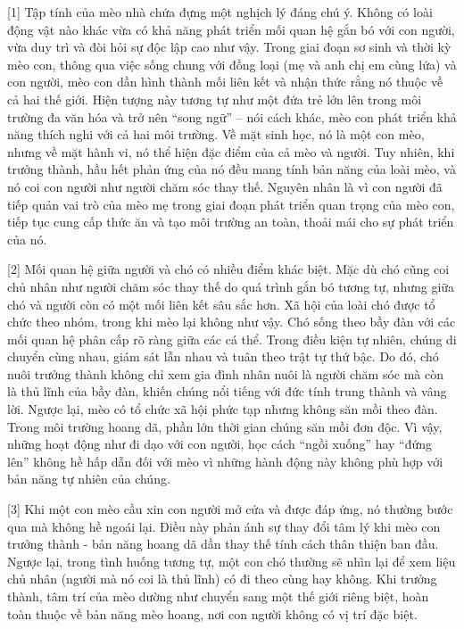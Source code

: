 \documentclass[12pt,a4paper,twoside]{article}
\newenvironment{readingpassage}[1][]{%
    \begin{tcolorbox}[enhanced, colback=grayLight, colframe=secondaryBlue,
        coltitle=textDark, fonttitle=\bfseries, title={#1},
        rounded corners, arc=3mm, boxrule=1pt,
        left=15pt, right=15pt, top=10pt, bottom=10pt,
        breakable, before skip=10pt, after skip=10pt, drop fuzzy shadow]
    \setstretch{1.3}
}{\end{tcolorbox}}
\begin{document}
\begin{readingpassage}[]
[1] Tập tính của mèo nhà chứa đựng một nghịch lý đáng chú ý. Không có loài động vật nào khác vừa có khả năng phát triển mối quan hệ gắn bó với con người, vừa duy trì và đòi hỏi sự độc lập cao như vậy. Trong giai đoạn sơ sinh và thời kỳ mèo con, thông qua việc sống chung với đồng loại (mẹ và anh chị em cùng lứa) và con người, mèo con dần hình thành mối liên kết và nhận thức rằng nó thuộc về cả hai thế giới. Hiện tượng này tương tự như một đứa trẻ lớn lên trong môi trường đa văn hóa và trở nên ``song ngữ'' -- nói cách khác, mèo con phát triển khả năng thích nghi với cả hai môi trường. Về mặt sinh học, nó là một con mèo, nhưng về mặt hành vi, nó thể hiện đặc điểm của cả mèo và người. Tuy nhiên, khi trưởng thành, hầu hết phản ứng của nó đều mang tính bản năng của loài mèo, và nó coi con người như người chăm sóc thay thế. Nguyên nhân là vì con người đã tiếp quản vai trò của mèo mẹ trong giai đoạn phát triển quan trọng của mèo con, tiếp tục cung cấp thức ăn và tạo môi trường an toàn, thoải mái cho sự phát triển của nó.

[2] Mối quan hệ giữa người và chó có nhiều điểm khác biệt. Mặc dù chó cũng coi chủ nhân như người chăm sóc thay thế do quá trình gắn bó tương tự, nhưng giữa chó và người còn có một mối liên kết sâu sắc hơn. Xã hội của loài chó được tổ chức theo nhóm, trong khi mèo lại không như vậy. Chó sống theo bầy đàn với các mối quan hệ phân cấp rõ ràng giữa các cá thể. Trong điều kiện tự nhiên, chúng di chuyển cùng nhau, giám sát lẫn nhau và tuân theo trật tự thứ bậc. Do đó, chó nuôi trưởng thành không chỉ xem gia đình nhân nuôi là người chăm sóc mà còn là thủ lĩnh của bầy đàn, khiến chúng nổi tiếng với đức tính trung thành và vâng lời. Ngược lại, mèo có tổ chức xã hội phức tạp nhưng không săn mồi theo đàn. Trong môi trường hoang dã, phần lớn thời gian chúng săn mồi đơn độc. Vì vậy, những hoạt động như đi dạo với con người, học cách ``ngồi xuống'' hay ``đứng lên'' không hề hấp dẫn đối với mèo vì những hành động này không phù hợp với bản năng tự nhiên của chúng.

[3] Khi một con mèo cầu xin con người mở cửa và được đáp ứng, nó thường bước qua mà không hề ngoái lại. Điều này phản ánh sự thay đổi tâm lý khi mèo con trưởng thành - bản năng hoang dã dần thay thế tính cách thân thiện ban đầu. Ngược lại, trong tình huống tương tự, một con chó thường sẽ nhìn lại để xem liệu chủ nhân (người mà nó coi là thủ lĩnh) có đi theo cùng hay không. Khi trưởng thành, tâm trí của mèo dường như chuyển sang một thế giới riêng biệt, hoàn toàn thuộc về bản năng mèo hoang, nơi con người không có vị trí đặc biệt.


\end{readingpassage}
\end{document}
